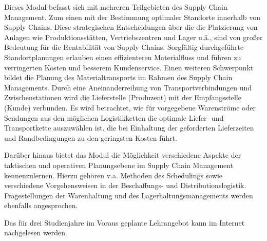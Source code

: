 \begin{module}
\begin{content}
Dieses Modul befasst sich mit mehreren Teilgebieten des Supply Chain Management. Zum einen mit der Bestimmung optimaler Standorte innerhalb von Supply Chains. Diese strategischen Entscheidungen über die die Platzierung von Anlagen wie Produktionsstätten, Vertriebszentren und Lager u.ä., sind von großer Bedeutung für die Rentabilität von Supply Chains. Sorgfältig durchgeführte Standortplanungen erlauben einen effizienteren Materialfluss und führen zu verringerten Kosten und besserem Kundenservice. Einen weiteren Schwerpunkt bildet die Planung des Materialtransports im Rahmen des Supply Chain Managements. Durch eine Aneinanderreihung von Transportverbindungen und Zwischenstationen wird die Lieferstelle (Produzent) mit der Empfangsstelle (Kunde) verbunden. Es wird betrachtet, wie für vorgegebene Warenströme oder Sendungen aus den möglichen Logistikketten die optimale Liefer- und Transportkette auszuwählen ist, die bei Einhaltung der geforderten Lieferzeiten und Randbedingungen zu den geringsten Kosten führt.

 

Darüber hinaus bietet das Modul die Möglichkeit verschiedene Aspekte der taktischen und operativen Planungsebene im Supply Chain Management kennenzulernen. Hierzu gehören v.a. Methoden des Schedulings sowie verschiedene Vorgehensweisen in der Beschaffungs- und Distributionslogistik. Fragestellungen der Warenhaltung und des Lagerhaltungsmanagements werden ebenfalls angesprochen.


\end{content}

\begin{remarks}Das für drei Studienjahre im Voraus geplante Lehrangebot kann im Internet nachgelesen werden.

\end{remarks}

\end{module}

